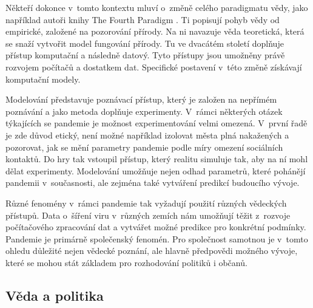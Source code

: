 Někteří dokonce v~tomto kontextu mluví o~změně celého paradigmatu vědy, jako například autoři knihy The Fourth Paradigm \cite{Hey2009}. Ti popisují pohyb vědy od empirické, založené na pozorování přírody. Na ni navazuje věda teoretická, která se snaží vytvořit model fungování přírody.  Tu ve dvacátém století doplňuje přístup komputační a následně datový. Tyto přístupy jsou umožněny právě rozvojem počítačů a dostatkem dat. Specifické postavení v~této změně získávají komputační modely.

Modelování představuje poznávací přístup, který je založen na nepřímém poznávání a jako metoda doplňuje experimenty. V~rámci některých otázek týkajících se pandemie je možnost experimentování velmi omezená. V~první řadě je zde důvod etický, není možné například izolovat města plná nakažených a pozorovat, jak se mění parametry pandemie podle míry omezení sociálních kontaktů. Do hry tak vstoupil přístup, který realitu simuluje tak, aby na ní mohl dělat experimenty. Modelování umožňuje nejen odhad parametrů, které pohánějí pandemii v~současnosti, ale zejména také vytváření predikcí budoucího vývoje.

Různé fenomény v~rámci pandemie tak vyžadují použití různých vědeckých pří\-stu\-pů. Data o~šíření viru v~různých zemích nám umožňují těžit z~rozvoje počítačového zpracování dat
a vytvářet možné predikce pro konkrétní podmínky. Pandemie je primárně společenský fenomén. Pro společnost samotnou je v~tomto ohledu důležité nejen vědecké poznání, ale hlavně předpovědi možného vývoje, které se mohou stát základem pro rozhodování politiků i občanů.

\subsection*{Věda a politika}

